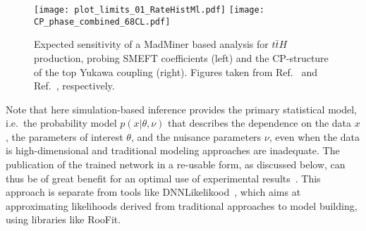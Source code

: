 \documentclass[submission,Phys]{SciPost}
\begin{document}
\begin{figure}[t!]
  \texttt{[image: plot\_limits\_01\_RateHistMl.pdf]}
  \texttt{[image: CP\_phase\_combined\_68CL.pdf]}
  \caption{Expected sensitivity of a MadMiner based analysis for $t\bar{t}H$ production, probing SMEFT coefficients (left) and the CP-structure of the top Yukawa coupling (right). Figures taken from Ref.~\cite{Brehmer:2019xox} and Ref.~\cite{Barman:2021yfh}, respectively.}
  \label{fig:madminer}
\end{figure}

Note that here simulation-based inference provides the primary statistical model, i.e.\ the  probability model $p(x|\theta, \nu)$ that describes the dependence on the data $x$, the parameters of interest $\theta$, and the nuisance parameters $\nu$, even when the data is high-dimensional and traditional modeling approaches are inadequate. The publication of the trained network in a re-usable form, as discussed below, can thus be of great benefit for an optimal use of experimental results~\cite{Cranmer:2021urp}.  This approach is separate from tools like  DNNLikelikood~\cite{Coccaro:2019lgs}, which aims at approximating likelihoods derived from traditional approaches to model building, using libraries like RooFit.
\end{document}
